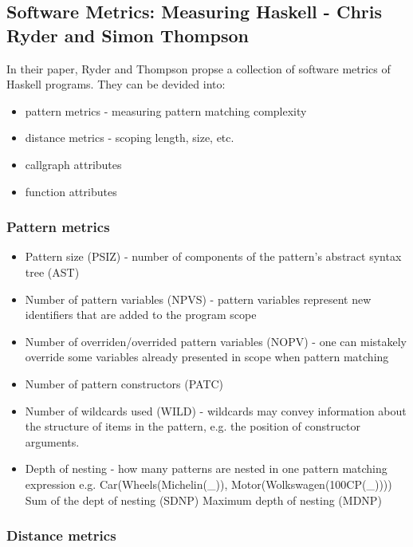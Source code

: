 \documentclass{article}
\begin{document}
\subsection{Software Metrics: Measuring Haskell - Chris Ryder and Simon Thompson}
In their paper, Ryder and Thompson propse a collection of software metrics of Haskell programs. They can be devided into:
\begin{itemize}
\item pattern metrics - measuring pattern matching complexity
\item distance metrics - scoping length, size, etc.
\item callgraph attributes 
\item function attributes
\end{itemize}

\subsubsection{Pattern metrics}
\begin{itemize}
\item Pattern size (PSIZ) - number of components of the pattern's abstract syntax tree (AST)
\item Number of pattern variables (NPVS) - pattern variables represent new identifiers that are added to the program scope
\item Number of overriden/overrided pattern variables (NOPV) - one can mistakely override some variables already presented in scope when pattern matching
\item Number of pattern constructors (PATC) 
\item Number of wildcards used (WILD) -  wildcards may convey information about the structure of items in the pattern, e.g. the position of constructor arguments.
\item Depth of nesting - how many patterns are nested in one pattern matching expression e.g. Car(Wheels(Michelin(\_)), Motor(Wolkswagen(100CP(\_))))
\subitem Sum of the dept of nesting (SDNP)
\subitem Maximum depth of nesting (MDNP)
\end{itemize}

\subsubsection{Distance metrics}
\end{document}
